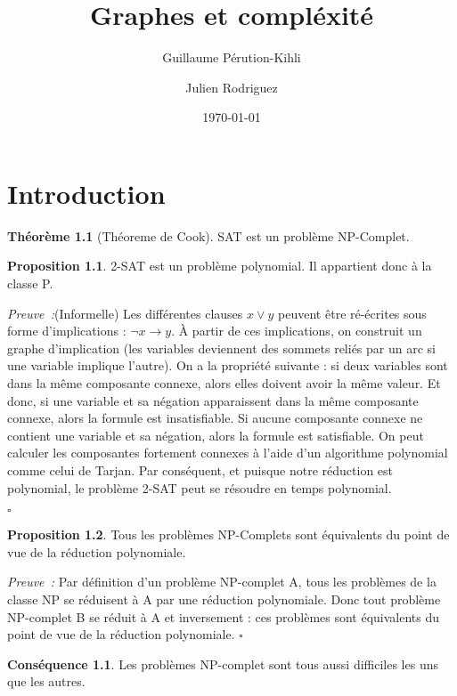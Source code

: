 \documentclass{book}
\title{Graphes et compléxité}
\author{
    Guillaume Pérution-Kihli\and
    Julien Rodriguez
}
\date{\today}
\theoremstyle{definition}
\newtheorem{theorem}{Théorème}
\newtheorem{proposition}{Proposition}
\newtheorem{consequence}{Conséquence}
\numberwithin{lemma}{subsection}
\numberwithin{theorem}{subsection}
\numberwithin{definition}{subsection}
\numberwithin{proposition}{subsection}
\numberwithin{corollary}{subsection}
\numberwithin{property}{subsection}
\numberwithin{example}{subsection}
\numberwithin{heuristique}{subsection}
\numberwithin{scenario}{subsection}
\newenvironment{proofi} {\noindent\emph{Preuve~:}} {\hfill $\square$\vspace{0.2cm}}
\begin{document}
\maketitle


\chapter{Introduction}

\begin{theorem}[Théoreme de Cook]
SAT est un problème NP-Complet. 
\end{theorem}

\begin{proposition}{2-SAT est un problème polynomial. Il appartient donc à la classe P.}
\end{proposition}

\begin{proofi}(Informelle)
Les différentes clauses $x \lor y$ peuvent être ré-écrites sous forme d'implications : $\neg x \rightarrow y$. À partir de ces implications, on construit un graphe d'implication (les variables deviennent des sommets reliés par un arc si une variable implique l'autre). On a la propriété suivante : si deux variables sont dans la même composante connexe, alors elles doivent avoir la même valeur. Et donc, si une variable et sa négation apparaissent dans la même composante connexe, alors la formule est insatisfiable. Si aucune composante connexe ne contient une variable et sa négation, alors la formule est satisfiable. On peut calculer les composantes fortement connexes à l'aide d'un algorithme polynomial comme celui de Tarjan. Par conséquent, et puisque notre réduction est polynomial, le problème 2-SAT peut se résoudre en temps polynomial.

\end{proofi}


\begin{proposition} Tous les problèmes NP-Complets sont équivalents du point de vue de la réduction polynomiale.
\end{proposition}

\begin{proofi}
Par définition d'un problème NP-complet A, tous les problèmes de la classe NP se réduisent à A par une réduction polynomiale. Donc tout problème NP-complet B se réduit à A et inversement : ces problèmes sont équivalents du point de vue de la réduction polynomiale.
\end{proofi}

\begin{consequence}
Les problèmes NP-complet sont tous aussi difficiles les uns que les autres.
\end{consequence}
\end{document}
